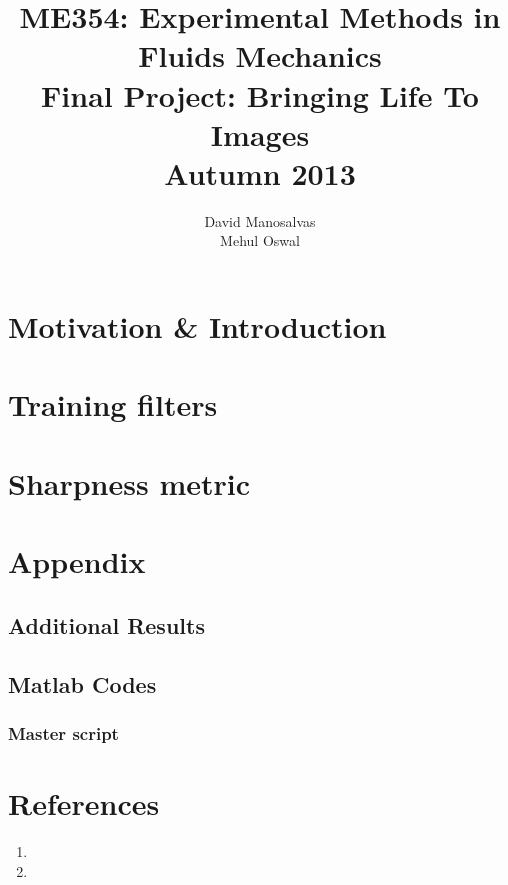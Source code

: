 \documentclass{article}
\title{ME354: Experimental Methods in Fluids Mechanics \\[8pt] \large Final Project: Bringing Life To Images \\ \large{Autumn 2013}}
\author{David Manosalvas \\ Mehul Oswal}
\date{}
\begin{document}
\maketitle
\pagestyle{fancy}
\section{Motivation \& Introduction}
\section{Training filters}
\section{Sharpness metric}

%                
%                

\newpage
\section{Appendix}
\subsection{Additional Results}
\subsection{Matlab Codes}
\subsubsection{Master script}
%
\section{References}
\begin{enumerate}
\item 
\item
\end{enumerate}
\end{document}
